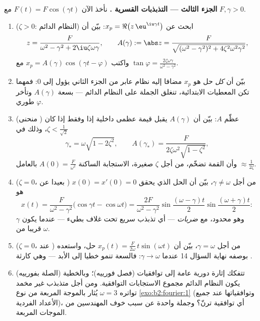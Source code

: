 \begin{problem}
\medskip
\noindent\textbf{الجزء الثالث --- التذبذبات القسرية .}
نأخذ الآن $F(t) = F\cos(\gamma t)$ مع $F, \gamma > 0$.
\begin{enumerate}[resume]
  \item ($\zeta > 0$: النظام الدائم) ابحث عن $x_p =
        \Re\bigl(z\,\eu^{\iu\gamma t}\bigr)$: بيّن أن
        \[
        z = \frac{F}{\omega^2 - \gamma^2 +
        2\iu\zeta\omega\gamma},
        \qquad
        A(\gamma) := \abs z = \frac{F}{\sqrt{(\omega^2 -
        \gamma^2)^2 + 4\zeta^2\omega^2\gamma^2}} ,
        \]
        واكتب $x_p = A(\gamma)\cos(\gamma t - \varphi)$ مع $\tan\varphi =
        \frac{2\zeta\omega\gamma}{\omega^2-\gamma^2}$.
  \item بيّن أن \emph{كل} حل هو $x_p$ مضافا إليه نظام عابر من
        الجزء الثاني يؤول إلى $0$: فمهما تكن المعطيات الابتدائية،
        تنغلق الجملة على النظام الدائم --- بسعة $A(\gamma)$ وتأخر طوري
        $\varphi$.
  \item (منحنى ) عظّم $A$: بيّن أن $A(\gamma)$ يقبل قيمة عظمى
        داخلية إذا وفقط إذا كان $\zeta <
        \frac{1}{\sqrt2}$، وذلك في
        \[
        \gamma_* = \omega\sqrt{1 - 2\zeta^2},
        \qquad
        A(\gamma_*) =
        \frac{F}{2\zeta\omega^2\sqrt{1-\zeta^2}} ,
        \]
        وأن القمة تضخّم، من أجل $\zeta$ صغيرة، الاستجابة الساكنة
        $A(0) = \frac F{\omega^2}$ بالعامل $\approx \frac{1}{2\zeta}$.
  \item ($\zeta = 0$، بعيدا عن ) من أجل $\gamma \neq \omega$، بيّن أن الحل الذي
        يحقق $x(0) = x'(0) = 0$ هو
        \[
        x(t) = \frac{F}{\omega^2 -
        \gamma^2}\bigl(\cos\gamma t - \cos\omega t\bigr)
        = \frac{2F}{\omega^2-\gamma^2}
        \sin\frac{(\omega-\gamma)t}{2}
        \sin\frac{(\omega+\gamma)t}{2} :
        \]
        وهو محدود، مع \emph{ضربات} --- أي تذبذب سريع تحت غلاف بطيء
        --- عندما يكون $\gamma$ قريبا من $\omega$.
  \item ($\zeta = 0$، عند ) من أجل $\gamma = \omega$، بيّن أن $x_p(t) = \frac{F}{2\omega}\,t\sin(\omega t)$ حل،
        واستعده بوصفه نهاية السؤال 14 عندما $\gamma \to \omega$: فالسعة تنمو
        خطيا إلى الأبد --- وهي كارثة .
  \item (الصلة بفورييه) تتفكك إثارة دورية عامة إلى توافقيات (فصل
        فورييه)؛ وبالخطية يكون النظام الدائم مجموع الاستجابات
        التوافقية. ومن أجل متذبذب غير مخمد تواتره $\omega = 3$ يُثار
        بالموجة المربعة من نوع \cref{exo:b2:fourier:1} (وتوافقياتها عند جميع الأعداد
        الفردية)، أي توافقية ترنّ؟ وجملة واحدة عن سبب خوف المهندسين
        من الموجات المربعة.
\end{enumerate}


\end{problem}
